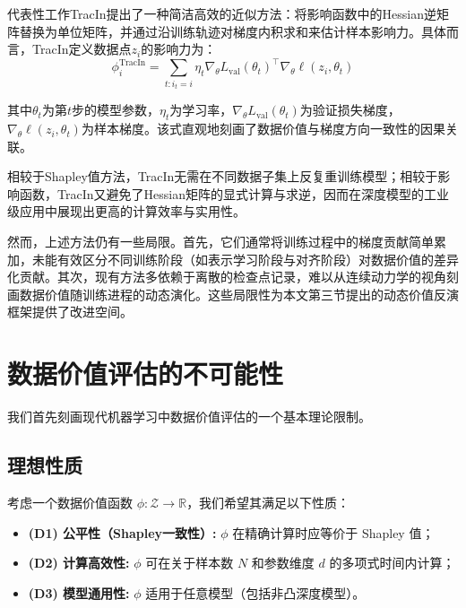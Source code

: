 代表性工作TracIn\cite{TracIn}提出了一种简洁高效的近似方法：将影响函数中的Hessian逆矩阵替换为单位矩阵，并通过沿训练轨迹对梯度内积求和来估计样本影响力。具体而言，TracIn定义数据点$z_i$的影响力为：
\begin{equation}
\phi_i^{\mathrm{TracIn}} = \sum_{t: i_t = i} \eta_t \nabla_{\theta} L_{\mathrm{val}}(\theta_t)^{\top} \nabla_{\theta} \ell(z_i, \theta_t)
\label{eq:tracin}
\end{equation}

其中$\theta_t$为第$t$步的模型参数，$\eta_t$为学习率，$\nabla_{\theta} L_{\mathrm{val}}(\theta_t)$为验证损失梯度，$\nabla_{\theta} \ell(z_i, \theta_t)$为样本梯度。该式直观地刻画了数据价值与梯度方向一致性的因果关联。

相较于Shapley值方法，TracIn无需在不同数据子集上反复重训练模型；相较于影响函数，TracIn又避免了Hessian矩阵的显式计算与求逆，因而在深度模型的工业级应用中展现出更高的计算效率与实用性。

然而，上述方法仍有一些局限。首先，它们通常将训练过程中的梯度贡献简单累加，未能有效区分不同训练阶段（如表示学习阶段与对齐阶段）对数据价值的差异化贡献。其次，现有方法多依赖于离散的检查点记录，难以从连续动力学的视角刻画数据价值随训练进程的动态演化。这些局限性为本文第三节提出的动态价值反演框架提供了改进空间。

\section{数据价值评估的不可能性}
\label{sec:nfl}

我们首先刻画现代机器学习中数据价值评估的一个基本理论限制。

\subsection{理想性质}

考虑一个数据价值函数 $\phi: \mathcal{Z} \to \mathbb{R}$，我们希望其满足以下性质：

\begin{itemize}
    \item \textbf{(D1) 公平性（Shapley一致性）:} $\phi$ 在精确计算时应等价于 Shapley 值；
    
    \item \textbf{(D2) 计算高效性:} $\phi$ 可在关于样本数 $N$ 和参数维度 $d$ 的多项式时间内计算；
    
    \item \textbf{(D3) 模型通用性:} $\phi$ 适用于任意模型（包括非凸深度模型）。
\end{itemize}

